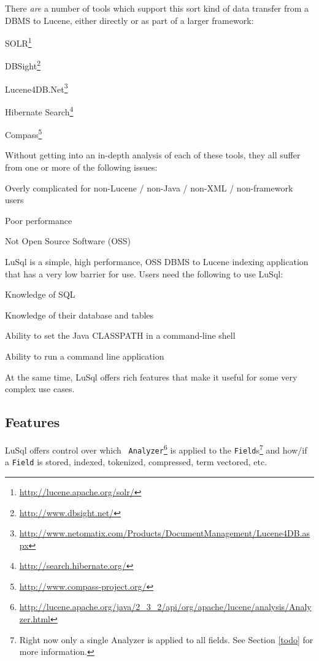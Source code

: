There {\em are} a number of tools which support this sort kind of data transfer
from a DBMS to Lucene, either directly or as part of a larger framework: 
\begin{mlist}
\item SOLR\footnote{\url{http://lucene.apache.org/solr/}}
\item DBSight\footnote{
        \url{http://www.dbsight.net/}
        }
\item Lucene4DB.Net\footnote{
        \url{http://www.netomatix.com/Products/DocumentManagement/Lucene4DB.aspx}
        }
\item Hibernate Search\footnote{
        \url{http://search.hibernate.org/}
        }
\item Compass\footnote{\url{http://www.compass-project.org/}}
\end{mlist}



Without getting into an in-depth analysis of each of these tools, they all suffer
from one or more of the following issues:
\begin{mlist}
\item Overly complicated for non-Lucene / non-Java / non-XML /
  non-framework users
\item Poor performance
\item Not Open Source Software (OSS)
\end{mlist}


LuSql is a simple, high performance, OSS DBMS to Lucene indexing
application that has a very low barrier for use.
Users need the following to use LuSql:
\begin{mlist}
\item Knowledge of SQL
\item Knowledge of their database and tables
\item Ability to set the Java CLASSPATH in a command-line shell
\item Ability to run a command line application
\end{mlist}

At the same time, LuSql offers rich features that make it useful for
some very complex use cases.




\subsection{Features}
LuSql offers control over which
{\tt
    Analyzer}\footnote{\url{http://lucene.apache.org/java/2_3_2/api/org/apache/lucene/analysis/Analyzer.html} 
  }
is applied to the 
{\tt Field}s\footnote{Right now only a single Analyzer is applied to all
  fields. See Section \ref{todo} for more information.} and how/if a
{\tt Field} is stored, indexed, tokenized, compressed, term vectored, etc.

